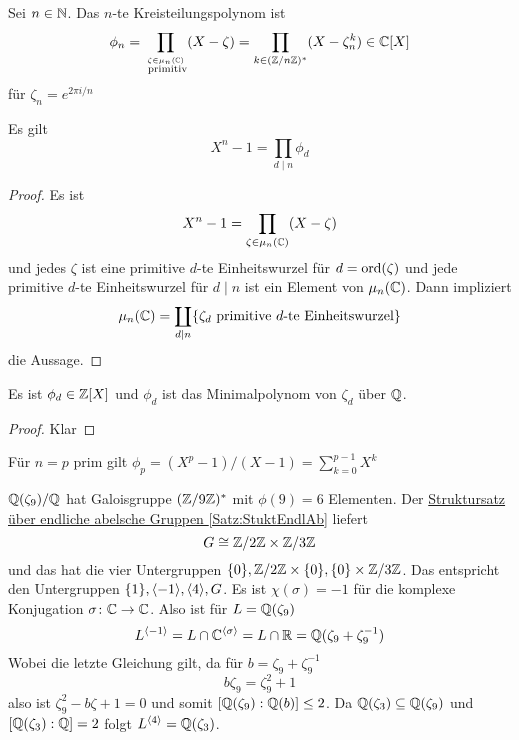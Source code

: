 \begin{Def}
    Sei $n\in\mathbb{N}$. Das $n$-te Kreisteilungspolynom ist $$\phi_n=\prod_{\stackrel{\zeta\in\mu_n(\mathbb{C})}{\text{ primitiv}}}(X-\zeta)=\prod_{k\in(\mathbb{Z}/n\mathbb{Z})^*}(X-\zeta_n^k)\in\mathbb{C}[X]$$ für $\zeta_n=e^{2\pi i/n}$
\end{Def}
\begin{Lemma}
Es gilt    $$X^n-1=\prod_{d\mid n}\phi_d$$
\end{Lemma}
\begin{proof}
   Es ist $$X^n-1=\prod_{\zeta\in\mu_n(\mathbb{C})}(X-\zeta)$$ und jedes $\zeta$ ist eine primitive $d$-te Einheitswurzel für $d=\operatorname{ord}(\zeta)$ und jede primitive $d$-te Einheitswurzel für $d\mid n$ ist ein Element von $\mu_n(\mathbb{C})$.
    Dann impliziert $$\mu_n(\mathbb{C})=\coprod_{d\mid n}\{\zeta_d \text{ primitive $d$-te Einheitswurzel}\}$$ die Aussage.
\end{proof}
\begin{Lemma}
 Es ist $\phi_d\in\mathbb{Z}[X]$ und $\phi_d$ ist das Minimalpolynom von $\zeta_d$ über $\mathbb{Q}$.
\end{Lemma}
\begin{proof}
    Klar
\end{proof}
\begin{Bem}
    Für $n=p$ prim gilt $\phi_p=(X^p-1)/(X-1)=\sum\limits_{k=0}^{p-1}X^k$
\end{Bem}
\begin{Bsp}
    $\mathbb{Q}(\zeta_9)/\mathbb{Q}$ hat Galoisgruppe $(\mathbb{Z}/9\mathbb{Z})^*$ mit $\phi(9)=6$ Elementen. Der \hyperref[Satz:StuktEndlAb]{Struktursatz über endliche abelsche Gruppen \ref{Satz:StuktEndlAb}} liefert $$G\cong \mathbb{Z}/2\mathbb{Z}\times \mathbb{Z}/3\mathbb{Z}$$ und das hat die vier Untergruppen $\{0\},\mathbb{Z}/2\mathbb{Z}\times\{0\}, \{0\}\times\mathbb{Z}/3\mathbb{Z}$.
    Das entspricht den Untergruppen $\{1\}, \langle-1\rangle, \langle 4\rangle,G$.
    Es ist $\chi(\sigma)=-1$ für die komplexe Konjugation $\sigma\colon\mathbb{C}\to\mathbb{C}$. Also ist für $L=\mathbb{Q}(\zeta_9)$
    $$L^{\langle -1\rangle}=L\cap \mathbb{C}^{\langle \sigma\rangle}=L\cap\mathbb{R}=\mathbb{Q}(\zeta_9+\zeta_9^{-1})$$
    Wobei die letzte Gleichung gilt, da für $b=\zeta_9+\zeta_9^{-1}$
    $$b\zeta_9=\zeta_9^2+1$$ also ist $\zeta_9^2-b\zeta+1=0$ und somit $[\mathbb{Q}(\zeta_9):\mathbb{Q}(b)]\leq 2$.
    Da $\mathbb{Q}(\zeta_3)\subseteq \mathbb{Q}(\zeta_9)$ und $[\mathbb{Q}(\zeta_3):\mathbb{Q}]=2$ folgt $L^{\langle 4\rangle}=\mathbb{Q}(\zeta_3)$.
\end{Bsp}

